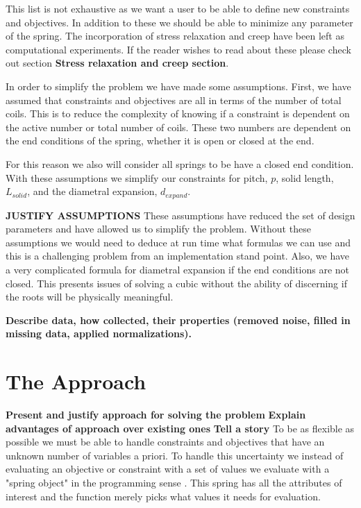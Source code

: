 \documentclass[10pt]{article}
\begin{document}
This list is not exhaustive as we want a user to be able to define new constraints and objectives. 
In addition to these we should be able to minimize any parameter of the spring. The incorporation of stress relaxation and creep have been left as computational experiments. If the reader wishes to read about these please check out section \textbf{Stress relaxation and creep section}. 

In order to simplify the problem we have made some assumptions. First, we have assumed that constraints and objectives are all in terms of the number of total coils. This is to reduce the complexity of knowing if a constraint is dependent on the active number or total number of coils. These two numbers are dependent on the end conditions of the spring, whether it is open or closed at the end. 

For this reason we also will consider all springs to be have a closed end condition. With these assumptions we simplify our constraints for pitch, $p$, solid length, $L_{solid}$, and the diametral expansion, $d_{expand}$.

\textbf{JUSTIFY ASSUMPTIONS}
These assumptions have reduced the set of design parameters and have allowed us to simplify the problem. Without these assumptions we would need to deduce at run time what formulas we can use and this is a challenging problem from an implementation stand point. Also, we have a very complicated formula for diametral expansion if the end conditions are not closed. This presents issues of solving a cubic without the ability of discerning if the roots will be physically meaningful. 


\textbf{Describe data, how collected, their properties (removed noise, filled in missing data, 
applied normalizations).}




\section{The Approach}
\label{sec:Approach}

\textbf{Present and justify approach for solving the problem}
\textbf{Explain advantages of approach over existing ones}
\textbf{Tell a story}
To be as flexible as possible we must be able to handle constraints and objectives that have an unknown number of  variables a priori. To handle this uncertainty we instead of evaluating an objective or constraint with a set of values we evaluate with a "spring object" in the programming sense \cite{OOP}. This spring has all the attributes of interest and the function merely picks what values it needs for evaluation. 
\end{document}
